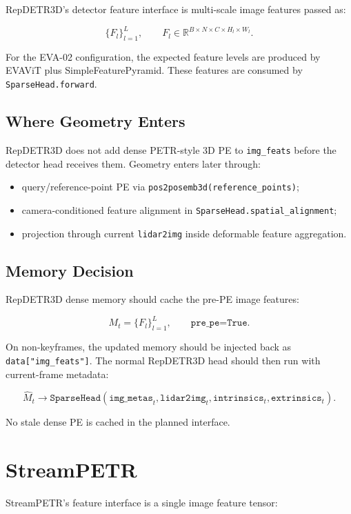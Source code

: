 \documentclass[11pt]{article}
\begin{document}
RepDETR3D's detector feature interface is multi-scale image features passed as:

\[
\{F_l\}_{l=1}^{L}, \qquad F_l \in \mathbb{R}^{B \times N \times C \times H_l \times W_l}.
\]

For the EVA-02 configuration, the expected feature levels are produced by EVAViT plus SimpleFeaturePyramid. These features are consumed by \texttt{SparseHead.forward}.

\subsection{Where Geometry Enters}

RepDETR3D does not add dense PETR-style 3D PE to \texttt{img\_feats} before the detector head receives them. Geometry enters later through:

\begin{itemize}[noitemsep]
  \item query/reference-point PE via \texttt{pos2posemb3d(reference\_points)};
  \item camera-conditioned feature alignment in \texttt{SparseHead.spatial\_alignment};
  \item projection through current \texttt{lidar2img} inside deformable feature aggregation.
\end{itemize}

\subsection{Memory Decision}

RepDETR3D dense memory should cache the pre-PE image features:

\[
M_t = \{F_l\}_{l=1}^{L}, \qquad \texttt{pre\_pe=True}.
\]

On non-keyframes, the updated memory should be injected back as \texttt{data["img\_feats"]}. The normal RepDETR3D head should then run with current-frame metadata:

\[
\hat{M}_t \rightarrow \texttt{SparseHead}(\texttt{img\_metas}_t, \texttt{lidar2img}_t, \texttt{intrinsics}_t, \texttt{extrinsics}_t).
\]

No stale dense PE is cached in the planned interface.

\section{StreamPETR}

StreamPETR's feature interface is a single image feature tensor:
\end{document}
